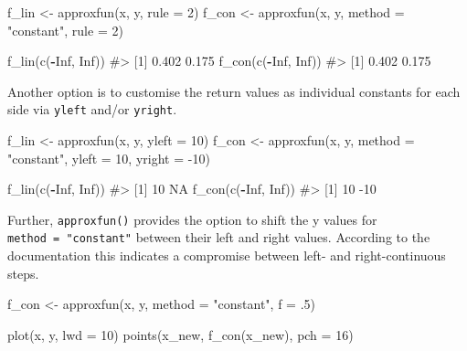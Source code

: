 \documentclass[
]{krantz}
\makeatletter
\newenvironment{Shaded}{\begin{snugshade}}{\end{snugshade}}
\newcommand{\CommentTok}[1]{\textcolor[rgb]{0.56,0.35,0.01}{\textit{#1}}}
\newcommand{\DataTypeTok}[1]{\textcolor[rgb]{0.13,0.29,0.53}{#1}}
\newcommand{\DecValTok}[1]{\textcolor[rgb]{0.00,0.00,0.81}{#1}}
\newcommand{\FloatTok}[1]{\textcolor[rgb]{0.00,0.00,0.81}{#1}}
\newcommand{\KeywordTok}[1]{\textcolor[rgb]{0.13,0.29,0.53}{\textbf{#1}}}
\newcommand{\NormalTok}[1]{#1}
\newcommand{\OperatorTok}[1]{\textcolor[rgb]{0.81,0.36,0.00}{\textbf{#1}}}
\newcommand{\OtherTok}[1]{\textcolor[rgb]{0.56,0.35,0.01}{#1}}
\newcommand{\StringTok}[1]{\textcolor[rgb]{0.31,0.60,0.02}{#1}}
\newenvironment{kframe}{%
\medskip{}
\setlength{\fboxsep}{.8em}
 \def\at@end@of@kframe{}%
 \ifinner\ifhmode%
  \def\at@end@of@kframe{\end{minipage}}%
  \begin{minipage}{\columnwidth}%
 \fi\fi%
 \def\FrameCommand##1{\hskip\@totalleftmargin \hskip-\fboxsep
 \colorbox{shadecolor}{##1}\hskip-\fboxsep
     \hskip-\linewidth \hskip-\@totalleftmargin \hskip\columnwidth}%
 \MakeFramed {\advance\hsize-\width
   \@totalleftmargin\z@ \linewidth\hsize
   \@setminipage}}%
 {\par\unskip\endMakeFramed%
 \at@end@of@kframe}
\renewenvironment{Shaded}{\begin{kframe}}{\end{kframe}}
\renewcommand{\KeywordTok} [1]{\textcolor[rgb]{0.00,0.44,0.13}{{#1}}}
\renewcommand{\DataTypeTok}[1]{\textcolor[rgb]{0.56,0.13,0.00}{{#1}}}
\renewcommand{\DecValTok}  [1]{\textcolor[rgb]{0.25,0.63,0.44}{{#1}}}
\renewcommand{\FloatTok}   [1]{\textcolor[rgb]{0.25,0.63,0.44}{{#1}}}
\renewcommand{\StringTok}  [1]{\textcolor[rgb]{0.25,0.44,0.63}{{#1}}}
\renewcommand{\CommentTok} [1]{\textcolor[rgb]{0.38,0.63,0.69}{{#1}}}
\renewcommand{\OtherTok}   [1]{\textcolor[rgb]{0.00,0.44,0.13}{{#1}}}
\renewcommand{\NormalTok}  [1]{{#1}}
\makeatother
\begin{document}
\begin{Shaded}
\begin{Highlighting}[]
\NormalTok{f_lin <-}\StringTok{ }\KeywordTok{approxfun}\NormalTok{(x, y, }\DataTypeTok{rule =} \DecValTok{2}\NormalTok{)}
\NormalTok{f_con <-}\StringTok{ }\KeywordTok{approxfun}\NormalTok{(x, y, }\DataTypeTok{method =} \StringTok{"constant"}\NormalTok{, }\DataTypeTok{rule =} \DecValTok{2}\NormalTok{)}

\KeywordTok{f_lin}\NormalTok{(}\KeywordTok{c}\NormalTok{(}\OperatorTok{-}\OtherTok{Inf}\NormalTok{, }\OtherTok{Inf}\NormalTok{))}
\CommentTok{#> [1] 0.402 0.175}
\KeywordTok{f_con}\NormalTok{(}\KeywordTok{c}\NormalTok{(}\OperatorTok{-}\OtherTok{Inf}\NormalTok{, }\OtherTok{Inf}\NormalTok{))}
\CommentTok{#> [1] 0.402 0.175}
\end{Highlighting}
\end{Shaded}

Another option is to customise the return values as individual constants for each side via \texttt{yleft} and/or \texttt{yright}.

\begin{Shaded}
\begin{Highlighting}[]
\NormalTok{f_lin <-}\StringTok{ }\KeywordTok{approxfun}\NormalTok{(x, y, }\DataTypeTok{yleft =} \DecValTok{10}\NormalTok{)}
\NormalTok{f_con <-}\StringTok{ }\KeywordTok{approxfun}\NormalTok{(x, y, }\DataTypeTok{method =} \StringTok{"constant"}\NormalTok{, }\DataTypeTok{yleft =} \DecValTok{10}\NormalTok{, }\DataTypeTok{yright =} \DecValTok{-10}\NormalTok{)}

\KeywordTok{f_lin}\NormalTok{(}\KeywordTok{c}\NormalTok{(}\OperatorTok{-}\OtherTok{Inf}\NormalTok{, }\OtherTok{Inf}\NormalTok{))}
\CommentTok{#> [1] 10 NA}
\KeywordTok{f_con}\NormalTok{(}\KeywordTok{c}\NormalTok{(}\OperatorTok{-}\OtherTok{Inf}\NormalTok{, }\OtherTok{Inf}\NormalTok{))}
\CommentTok{#> [1]  10 -10}
\end{Highlighting}
\end{Shaded}

Further, \texttt{approxfun()} provides the option to shift the y values for \texttt{method\ =\ "constant"} between their left and right values. According to the documentation this indicates a compromise between left- and right-continuous steps.

\begin{Shaded}
\begin{Highlighting}[]
\NormalTok{f_con <-}\StringTok{ }\KeywordTok{approxfun}\NormalTok{(x, y, }\DataTypeTok{method =} \StringTok{"constant"}\NormalTok{, }\DataTypeTok{f =} \FloatTok{.5}\NormalTok{)}

\KeywordTok{plot}\NormalTok{(x, y, }\DataTypeTok{lwd =} \DecValTok{10}\NormalTok{)}
\KeywordTok{points}\NormalTok{(x_new, }\KeywordTok{f_con}\NormalTok{(x_new), }\DataTypeTok{pch =} \DecValTok{16}\NormalTok{)}
\end{Highlighting}
\end{Shaded}
\end{document}
